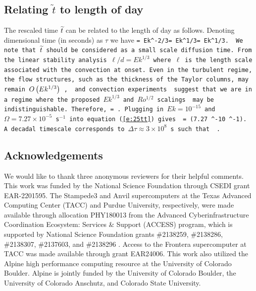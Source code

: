 \subsection{Relating $\widetilde{t}$ to length of day}

The rescaled time $\tt$ can be related to the length of day as follows. Denoting dimensional time (in seconds) as $\tau$ we have
\be 
\tt= Ek^{-2/3}\lb{}\rb \tau = Ek^{1/3}\lb{}\rb \lb{}\rb\tau = Ek^{1/3}\Omega \tau.
\label{e:25tt}
\ee
We note that $\tt$ should be considered as a small scale diffusion time. 
From the linear stability analysis $\ell/d = Ek^{1/3}$ where $\ell$ is the length scale associated with the convection at onset. 
Even in the turbulent regime, the flow structures, such as the thickness of the Taylor columns, may remain $O\lb Ek^{1/3}\rb $ \citep{tO23,jN24},
\textcolor{\revtxt}{
and convection experiments \citep{jA24} suggest that we are in a regime where the proposed $Ek^{1/3}$ and $Ro^{1/2}$ scalings \citep{cG19,jA20} may be indistinguishable}.
Therefore,
\be
\tt = \lb{}\rb \tau.
\ee
Plugging in $Ek=10^{-15}$ and $\Omega = 7.27 \times 10^{-5}$ s$^{-1}$ into equation (\ref{e:25tt}) gives 
\textcolor{\revttxt}{
\be
\tt = (7.27 ^{-10} ^{-1})\cdot \tau .
\ee
}
A decadal timescale corresponds to \textcolor{\revtxt}{$\Delta\tau \approx 3 \times 10^{8}$} s such that
\textcolor{\revtxt}{
\be
\Delta\tt {}.
\ee
}



\subsection*{Acknowledgements}

\textcolor{\revtxt}{We would like to thank three anonymous reviewers for their helpful comments.} This work was funded by the National Science Foundation through CSEDI grant EAR-2201595. The Stampede3 and Anvil supercomputers at the Texas Advanced Computing Center (TACC) and Purdue University, respectively, were made available through allocation PHY180013 from the Advanced Cyberinfrastructure Coordination Ecosystem: Services \& Support (ACCESS) program, which is supported by National Science Foundation grants \#2138259, \#2138286, \#2138307, \#2137603, and \#2138296 \citep{tB23}. Access to the Frontera supercomputer \citep{frontera} at TACC was made available through grant EAR24006. This work also utilized the Alpine high performance computing resource at the University of Colorado Boulder. Alpine is jointly funded by the University of Colorado Boulder, the University of Colorado Anschutz, and Colorado State University.

